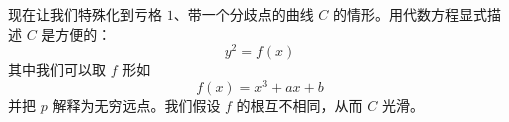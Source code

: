 现在让我们特殊化到亏格 $1$、带一个分歧点的曲线 $C$ 的情形。用代数方程显式描述 $C$ 是方便的：
\begin{equation}\tag{3.6}
y^2=f(x)
\end{equation}
其中我们可以取 $f$ 形如
\begin{equation}\tag{3.7}
f(x)=x^3+ax+b
\end{equation}
并把 $p$ 解释为无穷远点。我们假设 $f$ 的根互不相同，从而 $C$ 光滑。


